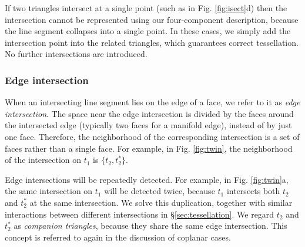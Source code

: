 If two triangles intersect at a single point (such as in Fig. \ref{fig:isect}d) then the intersection cannot be represented using our four-component description, because the line segment collapses into a single point. In these cases, we simply add the intersection point into the related triangles, which guarantees correct tessellation. No further intersections are introduced.

\subsubsection{Edge intersection}



When an intersecting line segment lies on the edge of a face, we refer to it as \emph{edge intersection}. The space near the edge intersection is divided by the faces around the intersected edge (typically two faces for a manifold edge), instead of by just one face. Therefore, the neighborhood of the corresponding intersection is a set of faces rather than a single face. For example, in Fig. \ref{fig:twin}, the neighborhood of the intersection on $t_1$ is $\{t_2, t^*_2\}$.


Edge intersections will be repeatedly detected. For example, in Fig. \ref{fig:twin}a, the same intersection on $t_1$ will be detected twice, because $t_1$ intersects both $t_2$ and $t_2^*$ at the same intersection. We solve this duplication, together with similar interactions between different intersections in \S\ref{sec:tessellation}. We regard $t_2$ and $t_2^*$ as \emph{companion triangles}, because they share the same edge intersection. This concept is referred to again in the discussion of coplanar cases.

